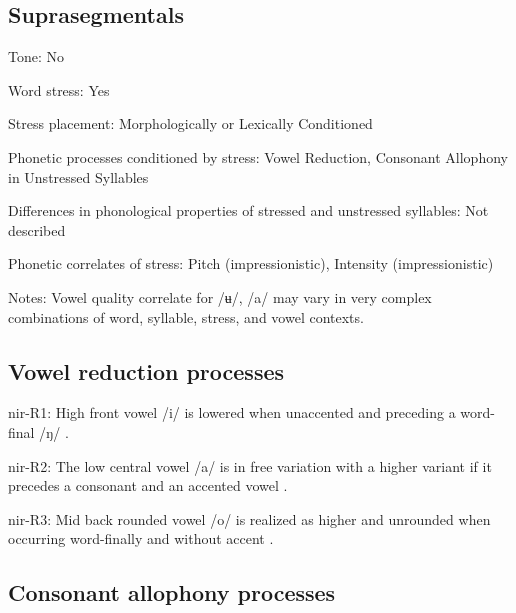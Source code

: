 {\subsection*{Suprasegmentals}
\begin{appendixdesc}
\item[Tone:] No

\item[Word stress:] Yes

\item[Stress placement:] Morphologically or Lexically Conditioned

\item[Phonetic processes conditioned by stress:] Vowel Reduction, Consonant Allophony in Unstressed Syllables

\item[Differences in phonological properties of stressed and unstressed syllables:] Not described

\item[Phonetic correlates of stress:] Pitch (impressionistic), Intensity (impressionistic)

\item[Notes:] Vowel quality correlate for /ʉ/, /a/ may vary in very complex combinations of word, syllable, stress, and vowel contexts.
\end{appendixdesc}
\subsection*{Vowel reduction processes}
\begin{appendixdesc}

\item[nir-R1:] High front vowel /i/ is lowered when unaccented and preceding a word-final /ŋ/ \citep[10]{Anceaux1965}.

\item[nir-R2:] The low central vowel /a/ is in free variation with a higher variant if it precedes a consonant and an accented vowel \citep[13]{Anceaux1965}.

\item[nir-R3:] Mid back rounded vowel /o/ is realized as higher and unrounded when occurring word-finally and without accent \citep[14]{Anceaux1965}.
\end{appendixdesc}
\subsection*{Consonant allophony processes}
\begin{appendixdesc}


\end{appendixdesc}}
